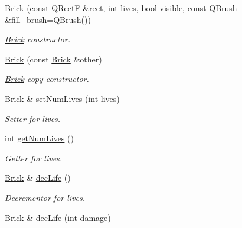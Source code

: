 \begin{DoxyCompactItemize}
\item 
\hypertarget{class_brick_a519f7d73685717c8e67532baf4542403}{\hyperlink{class_brick_a519f7d73685717c8e67532baf4542403}{Brick} (const Q\+Rect\+F \&rect, int lives, bool visible, const Q\+Brush \&fill\+\_\+brush=Q\+Brush())}\label{class_brick_a519f7d73685717c8e67532baf4542403}

\begin{DoxyCompactList}\small\item\em \hyperlink{class_brick}{Brick} constructor. \end{DoxyCompactList}\item 
\hyperlink{class_brick_a05b0f571f9d01b963cdf263b2a6c5ce8}{Brick} (const \hyperlink{class_brick}{Brick} \&other)
\begin{DoxyCompactList}\small\item\em \hyperlink{class_brick}{Brick} copy constructor. \end{DoxyCompactList}\item 
\hypertarget{class_brick_adeb99ee821f196f4cb508bf90ef09667}{\hyperlink{class_brick}{Brick} \& \hyperlink{class_brick_adeb99ee821f196f4cb508bf90ef09667}{set\+Num\+Lives} (int lives)}\label{class_brick_adeb99ee821f196f4cb508bf90ef09667}

\begin{DoxyCompactList}\small\item\em Setter for lives. \end{DoxyCompactList}\item 
\hypertarget{class_brick_ae9beaab99c939433bc14e32eebb84fa1}{int \hyperlink{class_brick_ae9beaab99c939433bc14e32eebb84fa1}{get\+Num\+Lives} ()}\label{class_brick_ae9beaab99c939433bc14e32eebb84fa1}

\begin{DoxyCompactList}\small\item\em Getter for lives. \end{DoxyCompactList}\item 
\hypertarget{class_brick_a88e3b8230a772d5779b411b1075abe43}{\hyperlink{class_brick}{Brick} \& \hyperlink{class_brick_a88e3b8230a772d5779b411b1075abe43}{dec\+Life} ()}\label{class_brick_a88e3b8230a772d5779b411b1075abe43}

\begin{DoxyCompactList}\small\item\em Decrementor for lives. \end{DoxyCompactList}\item 
\hypertarget{class_brick_a5b0ac3364dfe960b9fe6226e0c1c38e1}{\hyperlink{class_brick}{Brick} \& \hyperlink{class_brick_a5b0ac3364dfe960b9fe6226e0c1c38e1}{dec\+Life} (int damage)}\label{class_brick_a5b0ac3364dfe960b9fe6226e0c1c38e1}


\end{DoxyCompactItemize}
